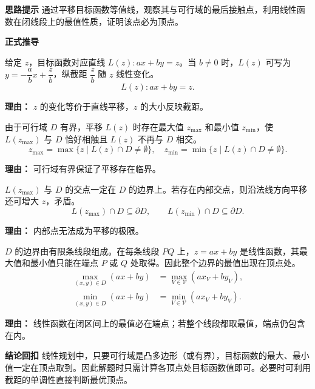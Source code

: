 \begin{proofbox}
	\textbf{\textcolor{CProof}{思路提示}}
	通过平移目标函数等值线，观察其与可行域的最后接触点，利用线性函数在闭线段上的最值性质，证明该点必为顶点。

	\medskip
	\textbf{\textcolor{CProof}{正式推导}}
	\begin{description}[style=nextline, leftmargin=2.8em, labelsep=0.5em, itemsep=0.55em]
		\item[\textbf{步骤一（等值线方程）：}]
			给定 $z$，目标函数对应直线 $L(z): ax+by=z$。当 $b\neq 0$ 时，$L(z)$ 可写为 $y=-\dfrac{a}{b}x+\dfrac{z}{b}$，纵截距 $\dfrac{z}{b}$ 随 $z$ 线性变化。
			\[
				L(z): ax+by=z.
			\]
			\par\textbf{理由：} $z$ 的变化等价于直线平移，$z$ 的大小反映截距。
		\item[\textbf{步骤二（平移临界）：}]
			由于可行域 $D$ 有界，平移 $L(z)$ 时存在最大值 $z_{\max}$ 和最小值 $z_{\min}$，使 $L(z_{\max})$ 与 $D$ 恰好相触且 $L(z)$ 不再与 $D$ 相交。
			\[
				z_{\max} = \max\{ z \mid L(z) \cap D \neq \emptyset \},\quad z_{\min} = \min\{ z \mid L(z) \cap D \neq \emptyset \}.
			\]
			\par\textbf{理由：} 可行域有界保证了平移存在临界。
		\item[\textbf{步骤三（最值点在边界）：}]
			$L(z_{\max})$ 与 $D$ 的交点一定在 $D$ 的边界上。若存在内部交点，则沿法线方向平移还可增大 $z$，矛盾。
			\[
				L(z_{\max}) \cap D \subseteq \partial D,
				\qquad
				L(z_{\min}) \cap D \subseteq \partial D.
			\]
			\par\textbf{理由：} 内部点无法成为平移的极限。
		\item[\textbf{步骤四（边界最值在端点）：}]
			$D$ 的边界由有限条线段组成。在每条线段 $PQ$ 上，$z=ax+by$ 是线性函数，其最大值和最小值只能在端点 $P$ 或 $Q$ 处取得。因此整个边界的最值出现在顶点处。
			\[
				\begin{aligned}
					\max_{(x,y)\in D} (ax+by) &= \max_{V\in \mathcal{V}} (a x_V + b y_V), \\ \min_{(x,y)\in D} (ax+by) &= \min_{V\in \mathcal{V}} (a x_V + b y_V).
			\end{aligned}
			\]
			\par\textbf{理由：} 线性函数在闭区间上的最值必在端点；若整个线段都取最值，端点仍包含在内。
	\end{description}

	\medskip
	\textbf{\textcolor{CProof}{结论回扣}}
	线性规划中，只要可行域是凸多边形（或有界），目标函数的最大、最小值一定在顶点取到。因此解题时只需计算各顶点处目标函数值即可。必要时可利用截距的单调性直接判断最优顶点。
\end{proofbox}
